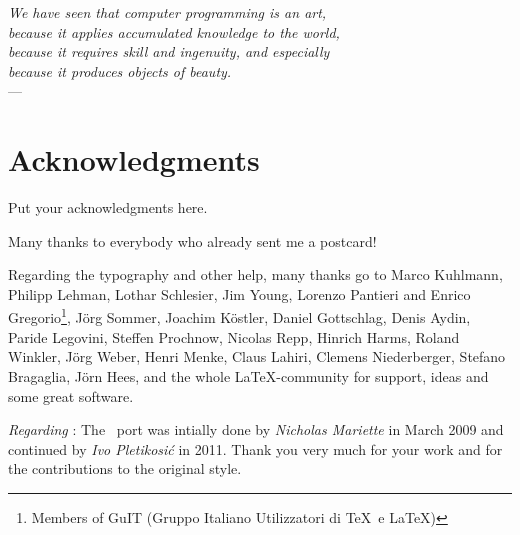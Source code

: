 
\begin{flushright}{\slshape    
    We have seen that computer programming is an art, \\ 
    because it applies accumulated knowledge to the world, \\ 
    because it requires skill and ingenuity, and especially \\
    because it produces objects of beauty.} \\ \medskip
    --- %
\end{flushright}



\bigskip

\begingroup
\let\clearpage\relax
\let\cleardoublepage\relax
\let\cleardoublepage\relax
\chapter*{Acknowledgments}
Put your acknowledgments here.

Many thanks to everybody who already sent me a postcard!

Regarding the typography and other help, many thanks go to Marco 
Kuhlmann, Philipp Lehman, Lothar Schlesier, Jim Young, Lorenzo 
Pantieri and Enrico Gregorio\footnote{Members of GuIT (Gruppo 
Italiano Utilizzatori di \TeX\ e \LaTeX )}, J\"org Sommer, 
Joachim K\"ostler, Daniel Gottschlag, Denis Aydin, Paride 
Legovini, Steffen Prochnow, Nicolas Repp, Hinrich Harms, 
 Roland Winkler, Jörg Weber, Henri Menke, Claus Lahiri, 
 Clemens Niederberger, Stefano Bragaglia, Jörn Hees, 
 and the whole \LaTeX-community for support, ideas and 
 some great software.

\bigskip

\noindent\emph{Regarding \mLyX}: The \mLyX\ port was intially done by 
\emph{Nicholas Mariette} in March 2009 and continued by 
\emph{Ivo Pletikosi\'c} in 2011. Thank you very much for your 
work and for the contributions to the original style.


\endgroup



